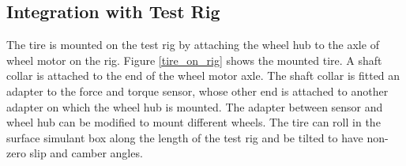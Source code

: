 \documentclass{article}
\begin{document}
\subsection{Integration with Test Rig}

The tire is mounted on the test rig by attaching the wheel hub to the axle of wheel motor on the rig. Figure \ref{tire_on_rig} shows the mounted tire. A shaft collar is attached to the end of the wheel motor axle. The shaft collar is fitted an adapter to the force and torque sensor, whose other end is attached to another adapter on which the wheel hub is mounted. The adapter between sensor and wheel hub can be modified to mount different wheels. The tire can roll in the surface simulant box along the length of the test rig and be tilted to have non-zero slip and camber angles. 
\end{document}
